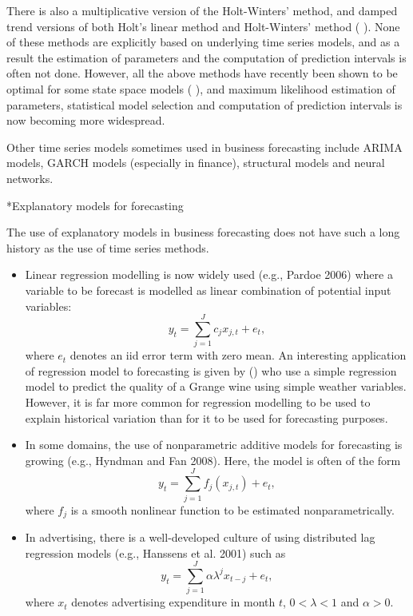 \documentclass[10pt]{article}
\makeatletter
\renewcommand{\subsection}%
{\@startsection{subsection}{1}{0mm}{\baselineskip}{0.5\baselineskip}{\normalfont\rmfamily\bfseries}}
\makeatother
\begin{document}
There is also a multiplicative version of the Holt-Winters' method, and damped trend versions of both Holt's linear method and Holt-Winters' method (\citeauthor{MWH3} \citeyear{MWH3}). None of these methods are explicitly based on underlying time series models, and as a result the estimation of parameters and the computation of prediction intervals is often not done. However, all the above methods have recently been shown to be optimal for some state space models (\citeauthor{expsmooth08} \citeyear{expsmooth08}), and maximum likelihood estimation of parameters, statistical model selection and computation of prediction intervals is now becoming more widespread.

Other time series models sometimes used in business forecasting include ARIMA models, GARCH models (especially in finance), structural models and neural networks.

\subsection*{Explanatory models for forecasting}

The use of explanatory models in business forecasting does not have such a long history as the use of time series methods.
\begin{itemize}
\item Linear regression modelling is now widely used (e.g., Pardoe 2006)
where a variable to be forecast is modelled as  linear combination of potential input variables:
\[
y_t = \sum_{j=1}^J c_j x_{j,t} + e_t,
\]
where $e_t$ denotes an iid error term with zero mean. An interesting application of regression model to forecasting is given by \citeauthor{BA95} (\citeyear{BA95}) who use a simple regression model to predict the quality of a Grange wine using simple weather variables.
However, it is far more common for regression modelling to be used to explain historical variation than for it to be used for forecasting purposes.

\item
In some domains, the use of nonparametric additive models for forecasting is growing (e.g., Hyndman and Fan 2008).  Here, the model is often of the form
\[
y_t = \sum_{j=1}^J f_j(x_{j,t}) + e_t,
\]
where $f_j$ is a smooth nonlinear function to be estimated nonparametrically.
\item In advertising, there is a well-developed culture of using distributed lag regression models (e.g., Hanssens et al. 2001) such as
\[
y_t = \sum_{j=1}^J \alpha\lambda^j x_{t-j} + e_t,
\]
where $x_t$ denotes advertising expenditure in month $t$, $0<\lambda<1$ and $\alpha>0$.
\end{itemize}
\end{document}
